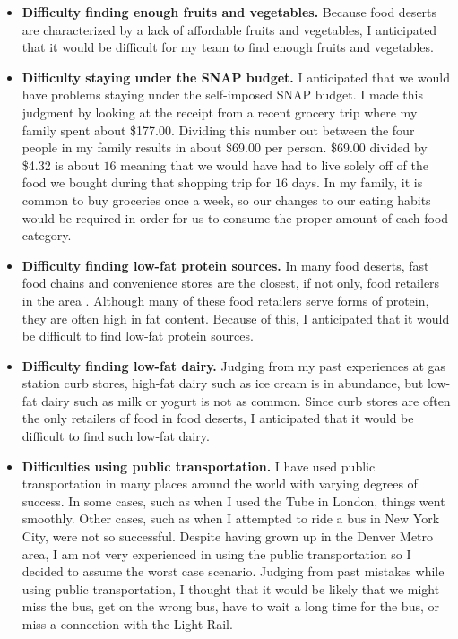\documentclass[11pt]{article}
\begin{document}
\begin{itemize}
    \item \textbf{Difficulty finding enough fruits and vegetables.} Because food deserts are
        characterized by a lack of affordable fruits and vegetables, I anticipated that it would be
        difficult for my team to find enough fruits and vegetables.

    \item \textbf{Difficulty staying under the SNAP budget.} I anticipated that we would have
        problems staying under the self-imposed SNAP budget. I made this judgment by looking at the
        receipt from a recent grocery trip where my family spent about \$177.00. Dividing this
        number out between the four people in my family results in about \$69.00 per person. \$69.00
        divided by \$4.32 is about $16$ meaning that we would have had to live solely off of the
        food we bought during that shopping trip for $16$ days. In my family, it is common to buy
        groceries once a week, so our changes to our eating habits would be required in order for us
        to consume the proper amount of each food category.

    \item \textbf{Difficulty finding low-fat protein sources.} In many food deserts, fast food
        chains and convenience stores are the closest, if not only, food retailers in the area
        \cite{gallagher}. Although many of these food retailers serve forms of protein, they are
        often high in fat content. Because of this, I anticipated that it would be difficult to find
        low-fat protein sources.

    \item \textbf{Difficulty finding low-fat dairy.} Judging from my past experiences at gas station
        curb stores, high-fat dairy such as ice cream is in abundance, but low-fat dairy such as
        milk or yogurt is not as common. Since curb stores are often the only retailers of food in
        food deserts, I anticipated that it would be difficult to find such low-fat dairy.

    \item \textbf{Difficulties using public transportation.} I have used public transportation in
        many places around the world with varying degrees of success. In some cases, such as when I
        used the Tube in London, things went smoothly. Other cases, such as when I attempted to ride
        a bus in New York City, were not so successful. Despite having grown up in the Denver Metro
        area, I am not very experienced in using the public transportation so I decided to assume
        the worst case scenario. Judging from past mistakes while using public transportation, I
        thought that it would be likely that we might miss the bus, get on the wrong bus, have to
        wait a long time for the bus, or miss a connection with the Light Rail.


\end{itemize}
\end{document}
